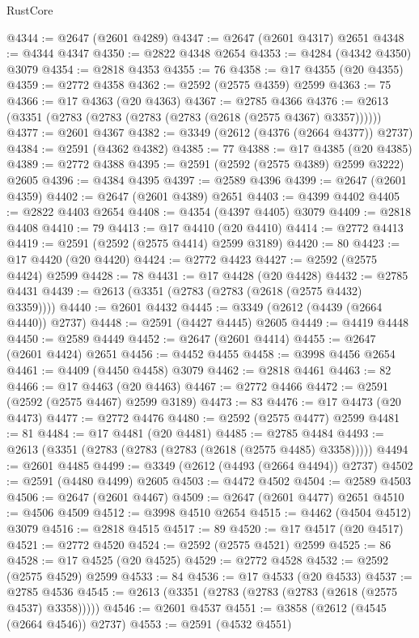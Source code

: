 \begin{lexlean}{RustCore}
\begin{coremodule}
@4344 := @2647 (@2601 @4289)
@4347 := @2647 (@2601 @4317) @2651
@4348 := @4344 @4347
@4350 := @2822 @4348 @2654
@4353 := @4284 (@4342 @4350) @3079
@4354 := @2818 @4353
@4355 := 76
@4358 := @17 @4355 (@20 @4355)
@4359 := @2772 @4358
@4362 := @2592 (@2575 @4359) @2599
@4363 := 75
@4366 := @17 @4363 (@20 @4363)
@4367 := @2785 @4366
@4376 := @2613 (@3351 (@2783 (@2783 (@2783 (@2783 (@2618 (@2575 @4367) @3357))))))
@4377 := @2601 @4367
@4382 := @3349 (@2612 (@4376 (@2664 @4377)) @2737)
@4384 := @2591 (@4362 @4382)
@4385 := 77
@4388 := @17 @4385 (@20 @4385)
@4389 := @2772 @4388
@4395 := @2591 (@2592 (@2575 @4389) @2599 @3222) @2605
@4396 := @4384 @4395
@4397 := @2589 @4396
@4399 := @2647 (@2601 @4359)
@4402 := @2647 (@2601 @4389) @2651
@4403 := @4399 @4402
@4405 := @2822 @4403 @2654
@4408 := @4354 (@4397 @4405) @3079
@4409 := @2818 @4408
@4410 := 79
@4413 := @17 @4410 (@20 @4410)
@4414 := @2772 @4413
@4419 := @2591 (@2592 (@2575 @4414) @2599 @3189)
@4420 := 80
@4423 := @17 @4420 (@20 @4420)
@4424 := @2772 @4423
@4427 := @2592 (@2575 @4424) @2599
@4428 := 78
@4431 := @17 @4428 (@20 @4428)
@4432 := @2785 @4431
@4439 := @2613 (@3351 (@2783 (@2783 (@2618 (@2575 @4432) @3359))))
@4440 := @2601 @4432
@4445 := @3349 (@2612 (@4439 (@2664 @4440)) @2737)
@4448 := @2591 (@4427 @4445) @2605
@4449 := @4419 @4448
@4450 := @2589 @4449
@4452 := @2647 (@2601 @4414)
@4455 := @2647 (@2601 @4424) @2651
@4456 := @4452 @4455
@4458 := @3998 @4456 @2654
@4461 := @4409 (@4450 @4458) @3079
@4462 := @2818 @4461
@4463 := 82
@4466 := @17 @4463 (@20 @4463)
@4467 := @2772 @4466
@4472 := @2591 (@2592 (@2575 @4467) @2599 @3189)
@4473 := 83
@4476 := @17 @4473 (@20 @4473)
@4477 := @2772 @4476
@4480 := @2592 (@2575 @4477) @2599
@4481 := 81
@4484 := @17 @4481 (@20 @4481)
@4485 := @2785 @4484
@4493 := @2613 (@3351 (@2783 (@2783 (@2783 (@2618 (@2575 @4485) @3358)))))
@4494 := @2601 @4485
@4499 := @3349 (@2612 (@4493 (@2664 @4494)) @2737)
@4502 := @2591 (@4480 @4499) @2605
@4503 := @4472 @4502
@4504 := @2589 @4503
@4506 := @2647 (@2601 @4467)
@4509 := @2647 (@2601 @4477) @2651
@4510 := @4506 @4509
@4512 := @3998 @4510 @2654
@4515 := @4462 (@4504 @4512) @3079
@4516 := @2818 @4515
@4517 := 89
@4520 := @17 @4517 (@20 @4517)
@4521 := @2772 @4520
@4524 := @2592 (@2575 @4521) @2599
@4525 := 86
@4528 := @17 @4525 (@20 @4525)
@4529 := @2772 @4528
@4532 := @2592 (@2575 @4529) @2599
@4533 := 84
@4536 := @17 @4533 (@20 @4533)
@4537 := @2785 @4536
@4545 := @2613 (@3351 (@2783 (@2783 (@2783 (@2618 (@2575 @4537) @3358)))))
@4546 := @2601 @4537
@4551 := @3858 (@2612 (@4545 (@2664 @4546)) @2737)
@4553 := @2591 (@4532 @4551)

\end{coremodule}
\end{lexlean}
